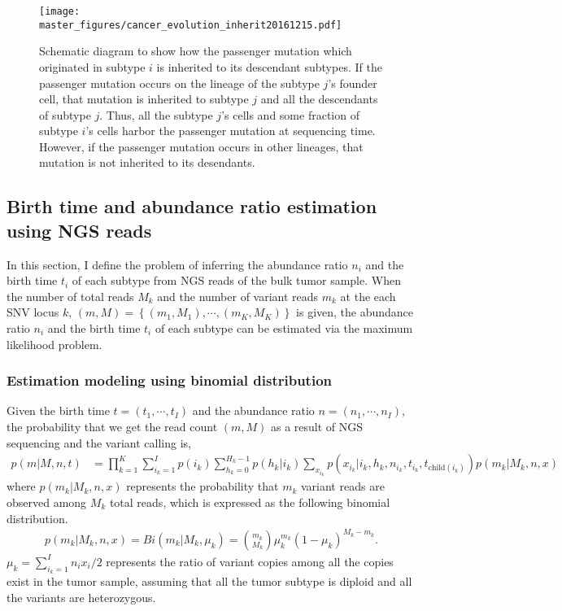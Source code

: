 \documentclass{article}
\begin{document}
\begin{figure}[H]
\begin{center}
   \texttt{[image: master\_figures/cancer\_evolution\_inherit20161215.pdf]}
 \caption{Schematic diagram to show how the passenger mutation which originated in subtype $i$ is inherited to its descendant subtypes.
 If the passenger mutation occurs on the lineage of the subtype $j$'s founder cell, that mutation is inherited to subtype $j$ and all the descendants of subtype $j$.
 Thus, all the subtype $j$'s cells and some fraction of subtype $i$'s cells harbor the passenger mutation at sequencing time.
 However, if the passenger mutation occurs in other lineages, that mutation is not inherited to its desendants.
 }
\end{center}     
\end{figure}
 
\subsection{Birth time and abundance ratio estimation using NGS reads}
In this section, I define the problem of inferring the abundance ratio $n_i$ and the birth time $t_i$ of each subtype from NGS reads of the bulk tumor sample.
When the number of total reads $M_k$ and the number of variant reads $m_k$ at the each SNV locus $k$, $(m, M) = \left\{(m_1, M_1), \cdots, (m_K, M_K) \right\}$ is given,
the abundance ratio $n_i$ and the birth time $t_i$ of each subtype can be estimated via the maximum likelihood problem.

\subsubsection{Estimation modeling using binomial distribution}
Given the birth time $t = (t_1, \cdots, t_I)$ and the abundance ratio $n = (n_1, \cdots, n_I)$, the probability that we get the read count $(m,M)$ as a result of NGS sequencing and the variant calling is,
\begin{align}
 p(m|M, n, t) & = \prod_{k=1}^{K} \sum_{i_k=1}^{I} p(i_k) \sum_{h_k=0}^{H_k-1} p(h_k | i_k) \sum_{x_{i_k}} p(x_{i_k} | i_k, h_k, n_{i_k}, t_{i_k}, t_{\mathrm{child}(i_k)}) p (m_k | M_k, n, x) \label{binom_estimation_model}
\end{align}
where $p (m_k | M_k, n, x)$ represents the probability that $m_k$ variant reads are observed among $M_k$ total reads, which is expressed as the following binomial distribution.
\begin{align}
 p (m_k | M_k, n, x) = Bi(m_k | M_k, \mu_k) = { m_k \choose M_k } \mu_k^{m_k} \left( 1 - \mu_k \right)^{M_k - m_k}.\label{param_estimation_binomial}
\end{align}
$\mu_k = \sum_{i_k = 1}^{I} n_i x_i / 2$ represents the ratio of variant copies among all the copies exist in the tumor sample, assuming that all the tumor subtype is diploid and all the variants are heterozygous.
\end{document}
